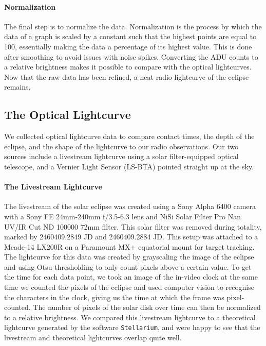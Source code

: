 \paragraph{Normalization}
The final step is to normalize the data.
Normalization is the process by which the data of a graph is scaled by a constant such that the highest points are equal to 100, essentially making the data a percentage of its highest value.
This is done after smoothing to avoid issues with noise spikes.
Converting the ADU counts to a relative brightness makes it possible to compare with the optical lightcurves.
\\
Now that the raw data has been refined, a neat radio lightcurve of the eclipse remains.
\subsection{\label{sec:optical}The Optical Lightcurve}
We collected optical lightcurve data to compare contact times, the depth of the eclipse, and the shape of the lightcurve to our radio observations. Our two sources include a livestream lightcurve using a solar filter-equipped optical telescope, and a Vernier Light Sensor (LS-BTA) pointed straight up at the sky.
\paragraph{The Livestream Lightcurve}
The livestream of the solar eclipse was created using a Sony Alpha 6400 camera with a Sony FE 24mm-240mm f/3.5-6.3 lens and NiSi Solar Filter Pro Nan UV/IR Cut ND 100000 72mm filter.
This solar filter was removed during totality, marked by 2460409.2849 JD and 2460409.2884 JD.
This setup was attached to a Meade-14 LX200R on a Paramount MX+ equatorial mount for target tracking.
The lightcurve for this data was created by grayscaling the image of the eclipse and using Otsu thresholding to only count pixels above a certain value.
To get the time for each data point, we took an image of the in-video clock at the same time we counted the pixels of the eclipse and used computer vision to recognise the characters in the clock, giving us the time at which the frame was pixel-counted.
The number of pixels of the solar disk over time can then be normalized to a relative brightness.
We compared this livestream lightcurve to a theoretical lightcurve generated by the software \texttt{Stellarium}\cite{zotti_simulated_2020}, and were happy to see that the livestream and theoretical lightcurves overlap quite well.
